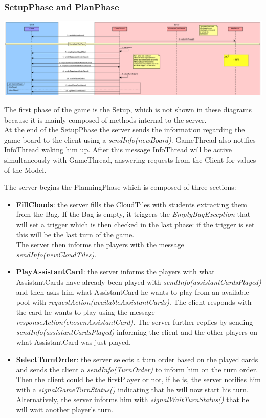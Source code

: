 \documentclass[12pt]{article}
\begin{document}
			\subsubsection{SetupPhase and PlanPhase}
				
				\begin{center}
					\includegraphics[width=\textwidth,height=\textheight,keepaspectratio]{Game_1}
				\end{center}
				
				The first phase of the game is the Setup, which is not shown in these diagrams because it is mainly composed of methods internal to the server. \\
				At the end of the SetupPhase the server sends the information regarding the game board to the client using a \emph{sendInfo(newBoard)}. GameThread also notifies InfoThread waking him up. After this message InfoThread will be active simultaneously with GameThread, answering requests from the Client for values of the Model.
				
				The server begins the PlanningPhase which is composed of three sections:
				\begin{itemize}
					\item \textbf{FillClouds}: the server fills the CloudTiles with students extracting them from the Bag. If the Bag is empty, it triggers the \emph{EmptyBagException} that will set a trigger which is then checked in the last phase: if the trigger is set this will be the last turn of the game. \\
					The server then informs the players with the message \emph{sendInfo(newCloudTiles)}.
					\item \textbf{PlayAssistantCard}: the server informs the players with what AssistantCards have already been played with \emph{sendInfo(assistantCardsPlayed)} and then asks him what AssistantCard he wants to play from an available pool with \emph{requestAction(availableAssistantCards)}. The client responds with the card he wants to play using the message \emph{responseAction(chosenAssistantCard)}. The server further replies by sending \emph{sendInfo(assistantCardsPlayed)} informing the client and the other players on what AssistantCard was just played. 
					\item \textbf{SelectTurnOrder}: the server selects a turn order based on the played cards and sends the client a \emph{sendInfo(TurnOrder)} to inform him on the turn order. Then the client could be the firstPlayer or not, if he is, the server notifies him with a \emph{signalGameTurnStatus()} indicating that he will now start his turn. Alternatively, the server informs him with \emph{signalWaitTurnStatus()} that he will wait another player's turn. 
				\end{itemize}
				
\end{document}
